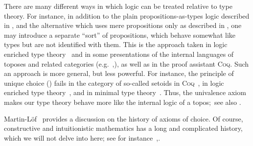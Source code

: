 \documentclass[12pt]{article}
\newcommand{\Coq}{\textsc{Coq}\xspace}
\begin{document}
There are many different ways in which logic can be treated relative to type theory.
For instance, in addition to the plain propositions-as-types logic described in , and the alternative which uses mere propositions only as described in , one may introduce a separate ``sort'' of propositions, which behave somewhat like types but are not identified with them.
This is the approach taken in logic enriched type theory~\cite{aczel2002collection} and in some presentations of the internal languages of toposes and related categories (e.g.~\cite{jacobs1999categorical},\cite{elephant}), as well as in the proof assistant \Coq.
Such an approach is more general, but less powerful.
For instance, the principle of unique choice () fails in the category of so-called setoids in \Coq~\cite{Spiwack}, in logic enriched type theory~\cite{aczel2002collection}, and in minimal type theory~\cite{maietti2005toward}.
Thus, the univalence axiom makes our type theory behave more like the internal logic of a topos;~see also .

Martin-L\"of~\cite{martin2006100} provides a discussion on the history of axioms of choice.
Of course, constructive and intuitionistic mathematics has a long and complicated history, which we will not delve into here; see for instance~\cite{TroelstraI},\cite{TroelstraII}.
\end{document}
